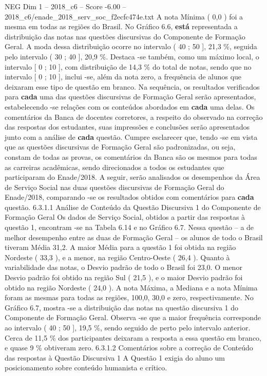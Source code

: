 \begin{textsample}{NEG Dim 1 – 2018\_c6 – Score -6.00 – 2018\_c6/enade\_2018\_serv\_soc\_f2ecfc474e.txt}
A nota Mínima ( 0,0 ) foi a mesma em todas as regiões do Brasil.
No Gráfico 6.6, \textbf{está} representada a distribuição das notas nas questões discursivas do Componente de Formação Geral.
A moda dessa distribuição ocorre no intervalo ( 40 ; 50 ], 21,3 \%, seguida pelo intervalo ( 30 ; 40 ], 20,9 \%.
Destaca -se também, como um máximo local, o intervalo [ 0 ; 10 ], com distribuição de 14,3 \% do total de notas, sendo que no intervalo [ 0 ; 10 ], inclui -se, além da nota zero, a frequência de alunos que deixaram esse tipo de questão em branco.
Na sequência, os resultados verificados para \textbf{cada} uma das questões discursivas de Formação Geral serão apresentados, estabelecendo -se relações com os conteúdos abordados em \textbf{cada} uma delas.
Os comentários da Banca de docentes corretores, a respeito do observado na correção das respostas dos estudantes, suas impressões e conclusões serão apresentados junto com a análise de \textbf{cada} questão.
Cumpre esclarecer que, tendo -se em vista que as questões discursivas de Formação Geral são padronizadas, ou seja, constam de todas as provas, os comentários da Banca são os mesmos para todas as carreiras acadêmicas, sendo direcionados a todos os estudantes que participaram do Enade/2018.
A seguir, serão analisados os desempenhos da Área de Serviço Social nas duas questões discursivas de Formação Geral do Enade/2018, comparando -se os resultados obtidos com comentários para \textbf{cada} questão. 6.3.1.1 Análise de Conteúdo da Questão Discursiva 1 do Componente de Formação Geral Os dados de Serviço Social, obtidos a partir das respostas à questão 1, encontram -se na Tabela 6.14 e no Gráfico 6.7.
Nessa questão – a de melhor desempenho entre as duas de Formação Geral – os alunos de todo o Brasil tiveram Média 31,2.
A maior Média para a questão 1 foi obtida na região Nordeste ( 33,3 ), e a menor, na região Centro-Oeste ( 26,4 ).
Quanto à variabilidade das notas, o Desvio padrão de todo o Brasil foi 23,0.
O menor Desvio padrão foi obtido na região Sul ( 21,5 ), e o maior Desvio padrão foi obtido na região Nordeste ( 24,0 ).
A nota Máxima, a Mediana e a nota Mínima foram as mesmas para todas as regiões, 100,0, 30,0 e zero, respectivamente.
No Gráfico 6.7, mostra -se a distribuição das notas na questão discursiva 1 do Componente de Formação Geral.
Observa -se que a maior frequência corresponde ao intervalo ( 40 ; 50 ], 19,5 \%, sendo seguido de perto pelo intervalo anterior.
Cerca de 11,5 \% dos participantes deixaram a resposta a essa questão em branco, e quase 9 \% obtiveram zero. 6.3.1.2 Comentários sobre a correção de Conteúdo das respostas à Questão Discursiva 1 A Questão 1 exigia do aluno um posicionamento sobre conteúdo humanista e crítico.

\end{textsample}
